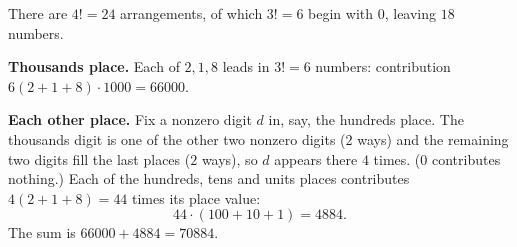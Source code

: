 There are $4!=24$ arrangements, of which $3!=6$ begin with $0$, leaving $18$ numbers.

\textbf{Thousands place.} Each of $2,1,8$ leads in $3!=6$ numbers: contribution $6(2+1+8)\cdot1000=66000$.

\textbf{Each other place.} Fix a nonzero digit $d$ in, say, the hundreds place. The thousands digit is one of the other two nonzero digits ($2$ ways) and the remaining two digits fill the last places ($2$ ways), so $d$ appears there $4$ times. ($0$ contributes nothing.) Each of the hundreds, tens and units places contributes $4(2+1+8)=44$ times its place value:
\[
44\cdot(100+10+1)=4884 .
\]
The sum is $66000+4884=\boxed{70884}$.
